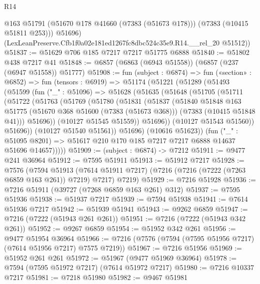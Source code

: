 \begin{lexlean}{R14}
\begin{coremodule}
          @163
          @51791
          (@51670 @178 @41660 (@7383 (@51673 @178)))
          (@7383 (@10415 @51811 @253)))
        @51696)
      (LexLeanPreserve.Cfb1f0a02e181ed1267fc8dbc524c35e9.R14.__rel_20 @51512))
@51837 := @51629 @706 @185 @7217 @7217 @51775 @6888
@51840 := @51802 @438 @7217 @41
@51848 := @6857 (@6863 (@6943 @51558)) (@6857 (@237 (@6947 @51558)) @51777)
@51908 := fun (subject : @6874) =>
  fun («section» : @6852) =>
  fun (tensors : @6919) =>
  @51174
    (@51221
      (@51289
        (@51493
          (@51599
            (fun ("_" : @51096) =>
            @51628
              (@51635
                (@51648
                  (@51705
                    (@51711
                      (@51722
                        (@51763
                          (@51769
                            (@51780
                              (@51831
                                (@51837
                                  (@51840
                                    @51848
                                    @163
                                    @51775
                                    (@51670 @368 @51600 (@7383 (@51673 @368)))
                                    (@7383 (@10415 @51848 @41)))
                                  @51696))
                              (@10127 @51545 @51559))
                            @51696))
                        (@10127 @51543 @51560))
                      @51696))
                  (@10127 @51540 @51561))
                @51696)
              (@10616 @51623))
            (fun ("_" : @51095 @8201) =>
            @51617 @210 @170 @185 @7217 @7217 @6888 @14637 @51696 @14657)))))
@51909 := (subject : @6874) -> @7212
@51911 := @9477 @241 @36964
@51912 := @7595 @51911
@51913 := @51912 @7217
@51928 := @7576
    (@7594
      @51913
      (@7614 @51911 @7217)
      (@7216 (@7216 (@7222 (@7263 @6859 @163 @261)) @7219) @7217)
      @7219)
@51929 := @7216 @51928
@51936 := @7216 @51911 (@39727 (@7268 @6859 @163 @261) @312)
@51937 := @7595 @51936
@51938 := @51937 @7217
@51939 := @7594 @51938
@51941 := @7614 @51936 @7217
@51942 := @51939 @51941
@51943 := @9262 @6859
@51947 := @7216 (@7222 (@51943 @261 @261))
@51951 := @7216 (@7222 (@51943 @342 @261))
@51952 := @9267 @6859
@51954 := @51952 @342 @261
@51956 := @9477 @51954 @36964
@51966 := @7216 (@7576 (@7594 (@7595 @51956 @7217) (@7614 @51956 @7217) @7575 @7219))
@51967 := @7216 @51956
@51969 := @51952 @261 @261
@51972 := @51967 (@9477 @51969 @36964)
@51978 := @7594 (@7595 @51972 @7217) (@7614 @51972 @7217)
@51980 := @7216 @10337 @7217
@51981 := @7218 @51980
@51982 := @9467 @51981

\end{coremodule}
\end{lexlean}
